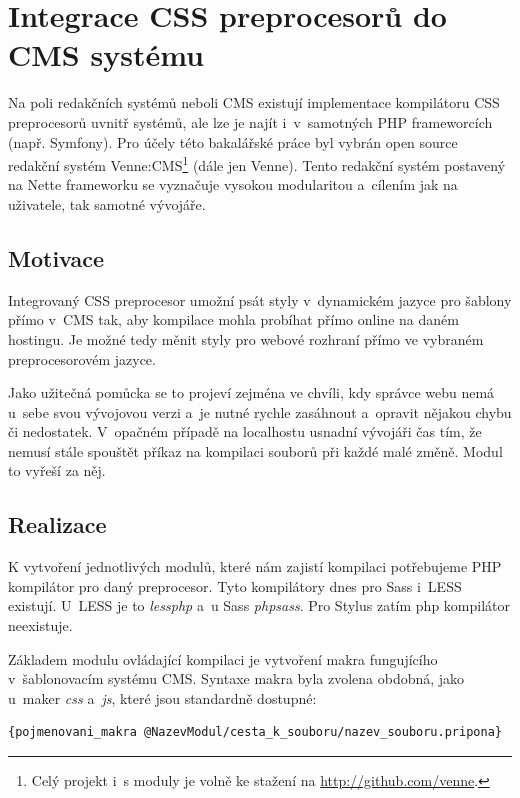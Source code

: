 \documentclass[thesis=B,czech]{FITthesis}[2012/06/26]
\begin{document}
\section{Integrace CSS preprocesorů do CMS systému}
\label{sec:cms}

Na poli redakčních systémů neboli \gls{CMS} existují implementace kompilátoru \gls{CSS} preprocesorů uvnitř systémů, ale lze je najít i~v~samotných \gls{PHP} frameworcích (např. Symfony). Pro účely této bakalářské práce byl vybrán open source redakční systém Venne:CMS\footnote{Celý projekt i~s moduly je volně ke stažení na \url{http://github.com/venne}.} (dále jen Venne). Tento redakční systém postavený na Nette frameworku se vyznačuje vysokou modularitou a~cílením jak na uživatele, tak samotné vývojáře.



\subsection{Motivace}

Integrovaný \gls{CSS} preprocesor umožní psát styly v~dynamickém jazyce pro šablony přímo v~\gls{CMS} tak, aby kompilace mohla probíhat přímo online na daném hostingu. Je možné tedy měnit styly pro webové rozhraní přímo ve vybraném preprocesorovém jazyce. 

Jako užitečná pomůcka se to projeví zejména ve chvíli, kdy správce webu nemá u~sebe svou vývojovou verzi a~je nutné rychle zasáhnout a~opravit nějakou chybu či nedostatek. V~opačném případě na localhostu usnadní vývojáři čas tím, že nemusí stále spouštět příkaz na kompilaci souborů při každé malé změně. Modul to vyřeší za něj. 



\subsection{Realizace}

K vytvoření jednotlivých modulů, které nám zajistí kompilaci potřebujeme \gls{PHP} kompilátor pro daný preprocesor. Tyto kompilátory dnes pro \gls{Sass} i~LESS existují. U~LESS je to \textit{lessphp} a~u \gls{Sass} \textit{phpsass}. Pro Stylus zatím php kompilátor neexistuje.
 
Základem modulu ovládající kompilaci je vytvoření makra fungujícího v~šablonovacím systému \gls{CMS}. Syntaxe makra byla zvolena obdobná, jako u~maker \textit{css} a~\textit{js}, které jsou standardně dostupné:
\scriptsize
\begin{verbatim}
{pojmenovani_makra @NazevModul/cesta_k_souboru/nazev_souboru.pripona}
\end{verbatim}
\normalsize
\end{document}
